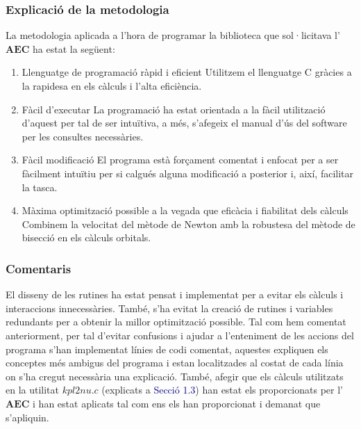 \documentclass[12pt]{article}
\begin{document}
\subsubsection{Explicació de la metodologia}
La metodologia aplicada a l'hora de programar la biblioteca que sol·licitava l'\textbf{$\mathbf{AEC}$} ha estat la següent:
\begin{enumerate}
\item Llenguatge de programació ràpid i eficient
\newline
Utilitzem el llenguatge C gràcies a la rapidesa en els càlculs i l'alta eficiència.
\item Fàcil d'executar
\newline
La programació ha estat orientada a la fàcil utilització d'aquest per tal de ser intuïtiva, a més, s'afegeix el manual d'ús del software per les consultes necessàries.
\item Fàcil modificació
\newline
El programa està forçament comentat i enfocat per a ser fàcilment intuïtiu per si calgués alguna modificació a posterior i, així, facilitar la tasca.
\item Màxima optimització possible a la vegada que eficàcia i fiabilitat dels càlculs
\newline
Combinem la velocitat del mètode de Newton amb la robustesa del mètode de bisecció en els càlculs orbitals.
\end{enumerate}
\newpage
\subsubsection{Comentaris}
El disseny de les rutines ha estat pensat i implementat per a evitar els càlculs i interaccions innecessàries. També, s'ha evitat la creació de rutines i variables redundants per a obtenir la millor optimització possible.
\newline
Tal com hem comentat anteriorment, per tal d'evitar confusions i ajudar a l'enteniment de les accions del programa s'han implementat línies de codi comentat, aquestes expliquen els conceptes més ambigus del programa i estan localitzades al costat de cada línia on s'ha cregut necessària una explicació.
\newline
També, afegir que els càlculs utilitzats en la utilitat $kpl2nu.c$ (explicats a \textcolor{navy}{Secció 1.3}) han estat els proporcionats per l'\textbf{$\mathbf{AEC}$} i han estat aplicats tal com ens els han proporcionat i demanat que s'apliquin.
\end{document}
